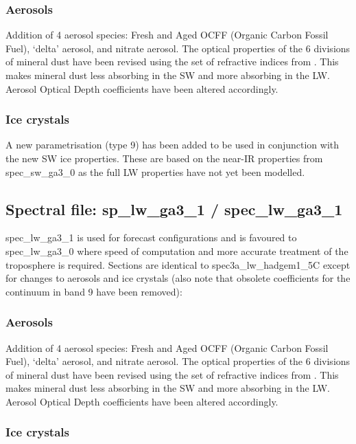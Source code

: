\subsubsection*{Aerosols}
 
Addition of 4 aerosol species: Fresh and Aged OCFF (Organic Carbon Fossil Fuel), `delta' aerosol, and nitrate aerosol. The optical properties of the 6 divisions of mineral dust have been revised using the set of refractive indices from \citet{Balkanski07}. This makes mineral dust less absorbing in the SW and more absorbing in the LW.
Aerosol Optical Depth coefficients have been altered accordingly.


\subsubsection*{Ice crystals}
 
A new parametrisation (type 9) has been added to be used in conjunction with the new SW ice properties. These are based on the near-IR properties from spec\_sw\_ga3\_0 as the full LW properties have not yet been modelled.


\subsection*{Spectral file: sp\_lw\_ga3\_1 / spec\_lw\_ga3\_1}

spec\_lw\_ga3\_1 is used for forecast configurations and is favoured to spec\_lw\_ga3\_0 where speed of computation and more accurate treatment of the troposphere is required. Sections are identical to spec3a\_lw\_hadgem1\_5C except for changes to aerosols and ice crystals (also note that obsolete coefficients for the continuum in band 9 have been removed):


\subsubsection*{Aerosols}
 
Addition of 4 aerosol species: Fresh and Aged OCFF (Organic Carbon Fossil Fuel), `delta' aerosol, and nitrate aerosol. The optical properties of the 6 divisions of mineral dust have been revised using the set of refractive indices from \citet{Balkanski07}. This makes mineral dust less absorbing in the SW and more absorbing in the LW.
Aerosol Optical Depth coefficients have been altered accordingly.


\subsubsection*{Ice crystals}
 

